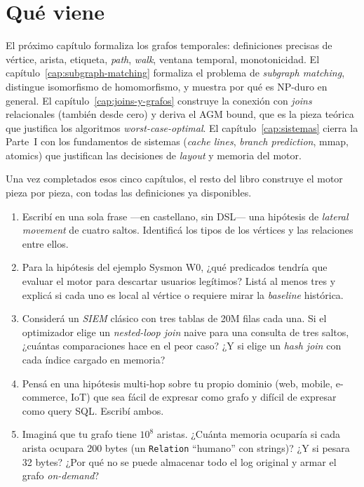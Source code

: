 \section{Qué viene}

El próximo capítulo formaliza los grafos temporales: definiciones
precisas de vértice, arista, etiqueta, \emph{path}, \emph{walk},
ventana temporal, monotonicidad. El capítulo~\ref{cap:subgraph-matching}
formaliza el problema de \emph{subgraph matching}, distingue
isomorfismo de homomorfismo, y muestra por qué es NP-duro en
general. El capítulo~\ref{cap:joins-y-grafos} construye la conexión
con \emph{joins} relacionales (también desde cero) y deriva el AGM
bound, que es la pieza teórica que justifica los algoritmos
\emph{worst-case-optimal}. El capítulo~\ref{cap:sistemas} cierra la
Parte~I con los fundamentos de sistemas (\emph{cache lines},
\emph{branch prediction}, mmap, atomics) que justifican las
decisiones de \emph{layout} y memoria del motor.

Una vez completados esos cinco capítulos, el resto del libro
construye el motor pieza por pieza, con todas las definiciones ya
disponibles.

\begin{ejercicios}
\begin{enumerate}
    \item \starred{} Escribí en una sola frase ---en castellano, sin
    DSL--- una hipótesis de \emph{lateral movement} de cuatro saltos.
    Identificá los tipos de los vértices y las relaciones entre ellos.

    \item Para la hipótesis del ejemplo Sysmon W0, ¿qué predicados
    tendría que evaluar el motor para descartar usuarios legítimos?
    Listá al menos tres y explicá si cada uno es local al vértice o
    requiere mirar la \emph{baseline} histórica.

    \item \starred{} Considerá un \emph{SIEM} clásico con tres
    tablas de 20M filas cada una. Si el optimizador elige un
    \emph{nested-loop join} naive para una consulta de tres saltos,
    ¿cuántas comparaciones hace en el peor caso? ¿Y si elige un
    \emph{hash join} con cada índice cargado en memoria?

    \item Pensá en una hipótesis multi-hop sobre tu propio dominio
    (web, mobile, e-commerce, IoT) que sea fácil de expresar como
    grafo y difícil de expresar como query SQL. Escribí ambos.

    \item Imaginá que tu grafo tiene \(10^{8}\) aristas. ¿Cuánta
    memoria ocuparía si cada arista ocupara 200 bytes (un
    \texttt{Relation} ``humano'' con strings)? ¿Y si pesara 32 bytes?
    ¿Por qué no se puede almacenar todo el log original y armar el
    grafo \emph{on-demand}?
\end{enumerate}
\end{ejercicios}

